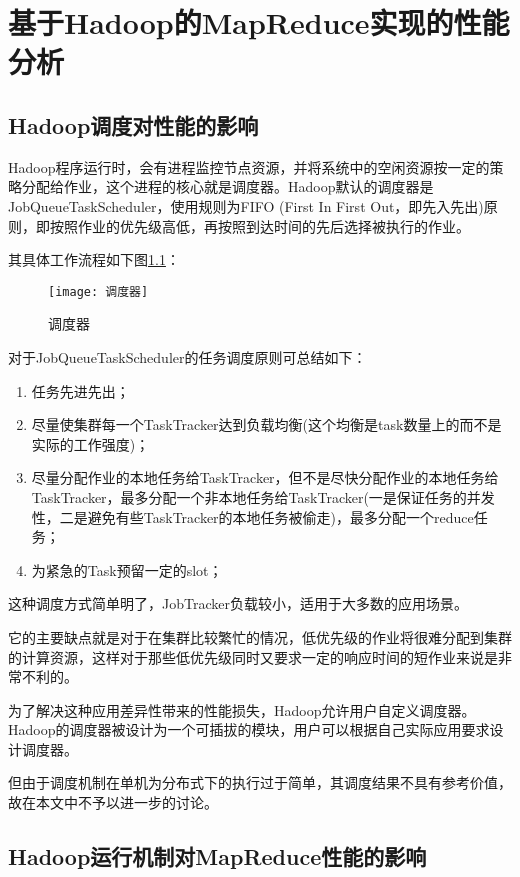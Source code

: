 \chapter{基于Hadoop的MapReduce实现的性能分析}
\label{chap:4}

\section{Hadoop调度对性能的影响}
Hadoop程序运行时，会有进程监控节点资源，并将系统中的空闲资源按一定的策略分配给作业，这个进程的核心就是调度器。Hadoop默认的调度器是JobQueueTaskScheduler，使用规则为FIFO (First In First Out，即先入先出)原则，即按照作业的优先级高低，再按照到达时间的先后选择被执行的作业。

其具体工作流程如下图\ref{fig:调度器}：
\begin{figure}[h]
 \centering
 \texttt{[image: 调度器]}
 \caption{调度器}
 \label{fig:调度器}
\end{figure}

对于JobQueueTaskScheduler的任务调度原则可总结如下：

\begin{enumerate}
\item 任务先进先出；
\item 尽量使集群每一个TaskTracker达到负载均衡(这个均衡是task数量上的而不是实际的工作强度)；
\item 尽量分配作业的本地任务给TaskTracker，但不是尽快分配作业的本地任务给TaskTracker，最多分配一个非本地任务给TaskTracker(一是保证任务的并发性，二是避免有些TaskTracker的本地任务被偷走)，最多分配一个reduce任务；
\item 为紧急的Task预留一定的slot；
\end{enumerate}

这种调度方式简单明了，JobTracker负载较小，适用于大多数的应用场景。

它的主要缺点就是对于在集群比较繁忙的情况，低优先级的作业将很难分配到集群的计算资源，这样对于那些低优先级同时又要求一定的响应时间的短作业来说是非常不利的。

为了解决这种应用差异性带来的性能损失，Hadoop允许用户自定义调度器。Hadoop的调度器被设计为一个可插拔的模块，用户可以根据自己实际应用要求设计调度器。

但由于调度机制在单机为分布式下的执行过于简单，其调度结果不具有参考价值，故在本文中不予以进一步的讨论。

\section{Hadoop运行机制对MapReduce性能的影响}
